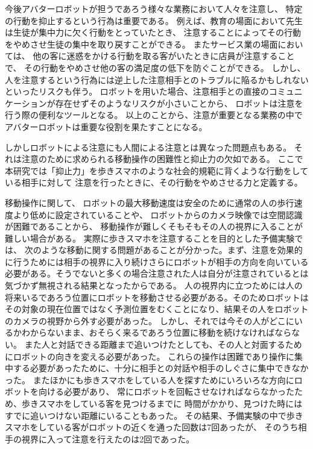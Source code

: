 \documentclass{kuisthesis}
\begin{document}
今後アバターロボットが担うであろう様々な業務において人々を注意し、
特定の行動を抑止するという行為は重要である。
例えば、教育の場面において先生は生徒が集中力に欠く行動をとっていたとき、
注意することによってその行動をやめさせ生徒の集中を取り戻すことができる。
またサービス業の場面においては、
他の客に迷惑をかける行動を取る客がいたときに店員が注意することで、
その行動をやめさせ他の客の満足度の低下を防ぐことができる。
しかし、人を注意するという行為には逆上した注意相手とのトラブルに陥るかもしれないといったリスクも伴う。
ロボットを用いた場合、注意相手との直接のコミュニケーションが存在せずそのようなリスクが小さいことから、
ロボットは注意を行う際の便利なツールとなる。
以上のことから、注意が重要となる業務の中でアバターロボットは重要な役割を果たすことになる。

しかしロボットによる注意にも人間による注意とは異なった問題点もある。
それは注意のために求められる移動操作の困難性と抑止力の欠如である。
ここで本研究では「抑止力」を歩きスマホのような社会的規範に背くような行動をしている相手に対して
注意を行ったときに、その行動をやめさせる力と定義する。

移動操作に関して、
ロボットの最大移動速度は安全のために通常の人の歩行速度より低めに設定されていることや、
ロボットからのカメラ映像では空間認識が困難であることから、
移動操作が難しくそもそもその人の視界に入ることが難しい場合がある。
実際に歩きスマホを注意することを目的とした予備実験では、%
次のような移動に関する問題があることが分かった。まず、注意を効果的に行うためには相手の視界に入り続けさらにロボットが相手の方向を向いている必要がある。そうでないと多くの場合注意された人は自分が注意されているとは気づかず無視される結果となったからである。
人の視界内に立つためには人の将来いるであろう位置にロボットを移動させる必要がある。そのためロボットはその対象の現在位置ではなく予測位置をむくことになり、結果その人をロボットのカメラの視野から外す必要があった。
しかし、それでは今その人がどこにいるかわからないまま、おそらく来るであろう位置に移動を続けなければならない。
また人と対話できる距離まで追いつけたとしても、その人と対面するためにロボットの向きを変える必要があった。
これらの操作は困難であり操作に集中する必要があったために、十分に相手との対話や相手のしぐさに集中できなかった。
またほかにも歩きスマホをしている人を探すためにいろいろな方向にロボットを向ける必要があり、
常にロボットを回転させなければならなかったため、歩きスマホをしている客を見つけるまでに
時間がかかり、見つけた時にはすでに追いつけない距離にいることもあった。
その結果、予備実験の中で歩きスマホをしている客がロボットの近くを通った回数は7回あったが、
そのうち相手の視界に入って注意を行えたのは2回であった。
\end{document}
